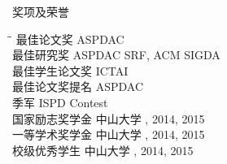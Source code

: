 
\begin{rSection}{奖项及荣誉}
\begin{tabbing}
\hspace{3.2in}\= \hspace{2.8in}\=\kill
    最佳论文奖                   \>ASPDAC                         \\  

    最佳研究奖      \> ASPDAC SRF, ACM SIGDA        \\

    最佳学生论文奖                     \>ICTAI                         \\   
    
    最佳论文奖提名                  \>ASPDAC                         \\  
    
    季军                 \> ISPD Contest        \\

    国家励志奖学金      \> 中山大学     , 2014, 2015 \\

    一等学术奖学金             \> 中山大学     , 2014, 2015 \\

    校级优秀学生                   \> 中山大学     , 2014, 2015 \\
\end{tabbing}
\end{rSection}

